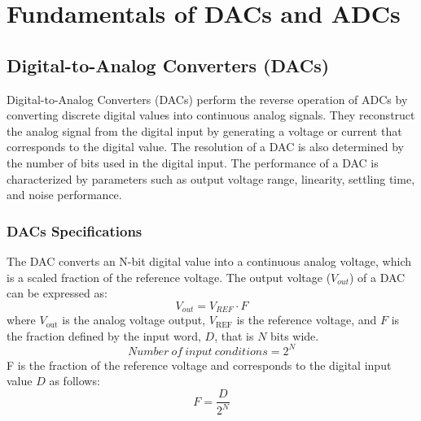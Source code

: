 \section{Fundamentals of DACs and ADCs}
\subsection{Digital-to-Analog Converters (DACs)}
Digital-to-Analog Converters (DACs) perform the reverse operation of ADCs by converting discrete digital values into continuous analog signals. They reconstruct the analog signal from the digital input by generating a voltage or current that corresponds to the digital value. The resolution of a DAC is also determined by the number of bits used in the digital input. The performance of a DAC is characterized by parameters such as output voltage range, linearity, settling time, and noise performance.

\subsubsection{DACs Specifications}
The DAC converts an N-bit digital value into a continuous analog voltage, which is a scaled fraction of the reference voltage.
The output voltage (\(V_{out}\)) of a DAC can be expressed as:
\begin{equation}
    V_{out} = V_{REF} \cdot F
\end{equation}
where \(V_{\text{out}}\) is the analog voltage output, \(V_{\text{REF}}\) is the reference voltage, and \(F\) is the fraction defined by the input word, \(D\), that is \(N\) bits wide.
\begin{equation}
    Number\ of\ input\ conditions = 2^N
\end{equation}
F is the fraction of the reference voltage and corresponds to the digital input value \(D\) as follows:
\begin{equation}
    F = \frac{D}{2^N}
\end{equation}
